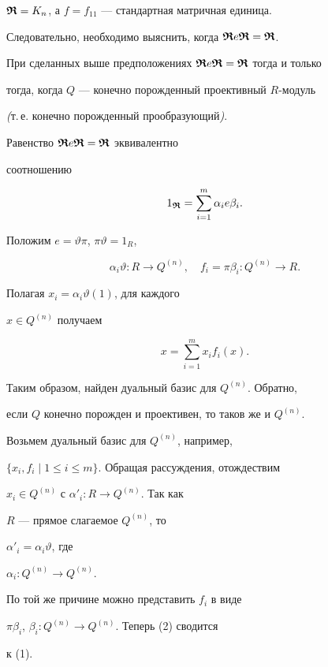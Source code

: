 $\boldsymbol{\frak R}=K_n$, а $f=f_{11}$ --- стандартная матричная единица.


Следовательно, необходимо выяснить, когда $\boldsymbol{\frak R} e \boldsymbol{\frak R} = \boldsymbol{\frak R}$.





\begin{lem}


При сделанных выше предположениях $\boldsymbol{\frak R} e \boldsymbol{\frak R}=\boldsymbol{\frak R}$ тогда и только


тогда, когда $Q$ --- конечно порожденный проективный $R$-модуль


{\em (}т.\,е. конечно порожденный прообразующий{\em )}.


\end{lem}





\begin{pf} Равенство $\boldsymbol{\frak R} e \boldsymbol{\frak R}=\boldsymbol{\frak R}$ эквивалентно


соотношению


\begin{equation}


1_{\R}=\sum_{i=1}^m \alpha_i e \beta_i.


\end{equation}


Положим $e=\vartheta \pi$, $\pi \vartheta=1_R$,


$$


\alpha_i \vartheta :R \longrightarrow Q^{(n)},\quad


f_i=\pi \beta_i :Q^{(n)}\longrightarrow R.


$$


Полагая $x_i=\alpha_i \vartheta(1)$, для каждого


$x \in Q^{(n)}$ получаем 


\begin{equation}


x=\sum_{i=1}^m x_i f_i(x).


\end{equation}


Таким образом, найден дуальный базис для $Q^{(n)}$. Обратно,


если $Q$ конечно порожден и проективен, то таков же и $Q^{(n)}$.


Возьмем дуальный базис для $Q^{(n)}$, например,


$\{ x_i,f_i\mid 1 \le i \le m \}$. Обращая рассуждения, отождествим


$x_i \in Q^{(n)}$ с $\alpha'_i: R \to Q^{(n)}$. Так как


$R$ --- прямое слагаемое $Q^{(n)}$, то


$\alpha'_i={\alpha}_i \vartheta$, где


$\alpha_i:Q^{(n)}\to Q^{(n)} $.


По той же причине можно представить $f_i$ в виде


$\pi\beta_i$, $\beta_i: Q^{(n)} \to Q^{(n)} $. Теперь (2) сводится


к (1).


\end{pf}





